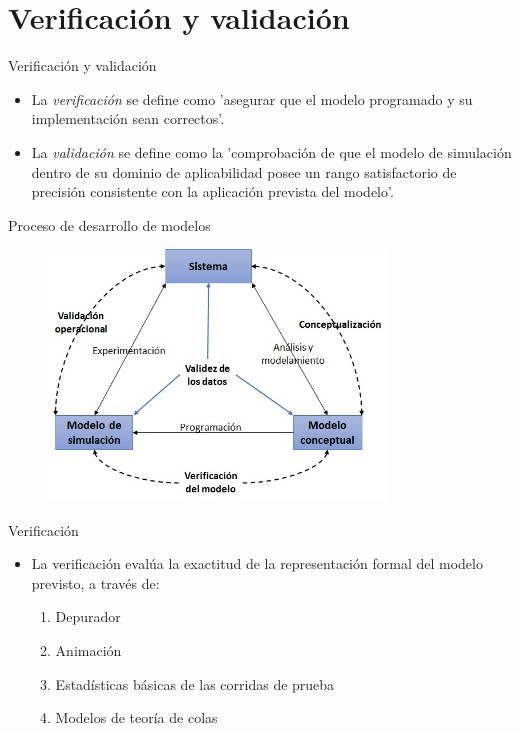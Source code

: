 \section{Verificación y validación}

\frame{\sectionpage}

\begin{frame}{Verificación y validación}
        \begin{itemize}
            \item La \textit{verificación} se define como 'asegurar que el modelo programado y su implementación sean correctos'.
            \item La \textit{validación} se define como la 'comprobación de que el modelo de simulación dentro de su dominio de aplicabilidad posee un rango satisfactorio de precisión consistente con la aplicación prevista del modelo'.
        \end{itemize}
\end{frame}

\begin{frame}{Proceso de desarrollo de modelos}
    \begin{figure}
        \centering
        \includegraphics[width=9cm]{images/vandv.jpg}
        \label{fig:my_label4}
    \end{figure}
\end{frame}

\begin{frame}{Verificación}
    \begin{itemize}
        \item La verificación evalúa la exactitud de la representación formal del modelo previsto, a través de:
        \begin{enumerate}
            \item Depurador
            \item Animación
            \item Estadísticas básicas de las corridas de prueba
            \item Modelos de teoría de colas
        \end{enumerate}
    \end{itemize}
\end{frame}


